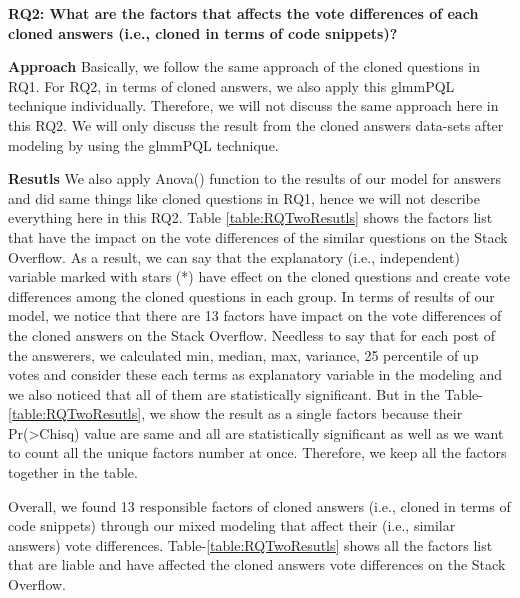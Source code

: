 \documentclass[conference]{IEEEtran}
\begin{document}
\textbf{RQ2: What are the factors that affects the vote differences of each cloned answers (i.e., cloned in terms of code snippets)?}\newline

\textbf{Approach} Basically, we follow the same approach of the cloned questions in RQ1. For RQ2, in terms of cloned answers,  we also apply this glmmPQL technique individually. Therefore, we will not discuss the same approach here in this RQ2. We will only discuss the result from the cloned answers data-sets after modeling by using the glmmPQL technique.\newline

\textbf{Resutls}  We also apply Anova() function to the results of our model for answers and did same things like cloned questions in RQ1, hence we will not describe everything here in this RQ2. Table \ref{table:RQTwoResutls} shows the factors list that have the impact on the vote differences of the similar questions on the Stack Overflow. As a result, we can say that the explanatory (i.e., independent) variable marked with stars (*) have effect on the cloned questions and create vote differences among the cloned questions in each group. In terms of results of our model, we notice that there are 13 factors have impact on the vote differences of the cloned answers on the Stack Overflow. Needless to say that for each post of the answerers, we calculated min, median, max, variance, 25 percentile of up votes and consider these each terms as explanatory variable in the modeling and we also noticed that all of them are statistically significant. But in the Table-\ref{table:RQTwoResutls}, we show the result as a single factors because their Pr(\textgreater Chisq) value are same and all are statistically significant as well as we want to count all the unique factors number at once. Therefore, we keep all the factors together in the table. 

Overall, we found 13 responsible factors of cloned answers (i.e., cloned in terms of code snippets) through our mixed modeling that affect their (i.e., similar answers) vote differences. Table-\ref{table:RQTwoResutls} shows  all the factors list that are liable and have affected the cloned answers vote differences on the Stack Overflow.
\end{document}
